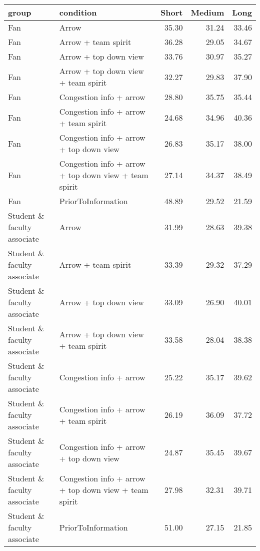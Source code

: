 \begin{tabular}{llrrr}
  \hline
group & condition & Short & Medium & Long \\ 
  \hline
Fan & Arrow & 35.30 & 31.24 & 33.46 \\ 
  Fan & Arrow + team spirit & 36.28 & 29.05 & 34.67 \\ 
  Fan & Arrow + top down view & 33.76 & 30.97 & 35.27 \\ 
  Fan & Arrow + top down view + team spirit & 32.27 & 29.83 & 37.90 \\ 
  Fan & Congestion info + arrow & 28.80 & 35.75 & 35.44 \\ 
  Fan & Congestion info + arrow + team spirit & 24.68 & 34.96 & 40.36 \\ 
  Fan & Congestion info + arrow + top down view & 26.83 & 35.17 & 38.00 \\ 
  Fan & Congestion info + arrow + top down view + team spirit & 27.14 & 34.37 & 38.49 \\ 
  Fan & PriorToInformation & 48.89 & 29.52 & 21.59 \\ 
  Student \& faculty associate & Arrow & 31.99 & 28.63 & 39.38 \\ 
  Student \& faculty associate & Arrow + team spirit & 33.39 & 29.32 & 37.29 \\ 
  Student \& faculty associate & Arrow + top down view & 33.09 & 26.90 & 40.01 \\ 
  Student \& faculty associate & Arrow + top down view + team spirit & 33.58 & 28.04 & 38.38 \\ 
  Student \& faculty associate & Congestion info + arrow & 25.22 & 35.17 & 39.62 \\ 
  Student \& faculty associate & Congestion info + arrow + team spirit & 26.19 & 36.09 & 37.72 \\ 
  Student \& faculty associate & Congestion info + arrow + top down view & 24.87 & 35.45 & 39.67 \\ 
  Student \& faculty associate & Congestion info + arrow + top down view + team spirit & 27.98 & 32.31 & 39.71 \\ 
  Student \& faculty associate & PriorToInformation & 51.00 & 27.15 & 21.85 \\ 
   \hline
\end{tabular}
